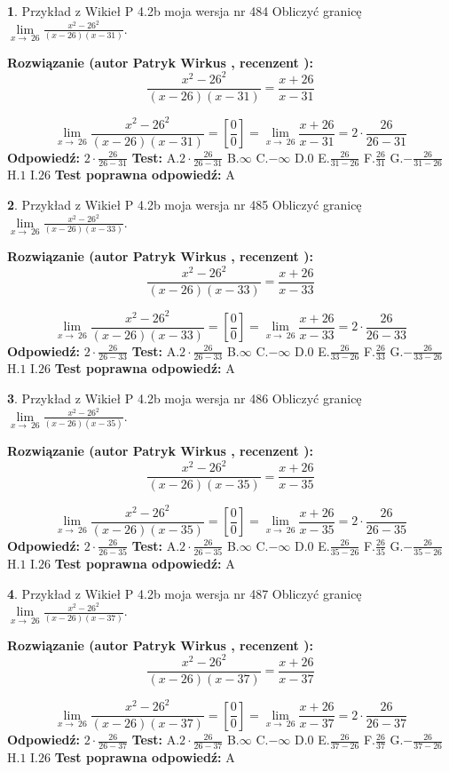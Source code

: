 \documentclass[12pt, a4paper]{article}
\theoremstyle{definition} %
\newtheorem{zad}{}
\newcommand{\zadStart}[1]{\begin{zad}#1\newline}
\newcommand{\zadStop}{\end{zad}}
\newcommand{\rozwStart}[2]{\noindent \textbf{Rozwiązanie (autor #1 , recenzent #2): }\newline}
\newcommand{\rozwStop}{\newline}
\newcommand{\odpStart}{\noindent \textbf{Odpowiedź:}\newline}
\newcommand{\odpStop}{\newline}
\newcommand{\testStart}{\noindent \textbf{Test:}\newline}
\newcommand{\testStop}{\newline}
\newcommand{\kluczStart}{\noindent \textbf{Test poprawna odpowiedź:}\newline}
\newcommand{\kluczStop}{\newline}
\begin{document}
\zadStart{Przykład z Wikieł P 4.2b moja wersja nr 484}
Obliczyć granicę $\lim\limits_{x\to\ 26}\frac{x^{2}-26^{2}}{(x-26)(x-31)}$.
\zadStop
\rozwStart{Patryk Wirkus}{}
$$\frac{x^{2}-26^{2}}{(x-26)(x-31)}=\frac{x+26}{x-31}$$

$$\lim\limits_{x\to\ 26}\frac{x^{2}-26^{2}}{(x-26)(x-31)}=[\frac{0}{0}]=\lim\limits_{x\to\ 26}\frac{x+26}{x-31}=2 \cdot \frac{26}{26-31}$$
\rozwStop
\odpStart
$2 \cdot \frac{26}{26-31}$
\odpStop
\testStart
A.$2 \cdot \frac{26}{26-31}$
B.$\infty$
C.$-\infty$
D.$0$
E.$\frac{26}{31-26}$
F.$\frac{26}{31}$
G.$-\frac{26}{31-26}$
H.$1$
I.$26$
\testStop
\kluczStart
A
\kluczStop



\zadStart{Przykład z Wikieł P 4.2b moja wersja nr 485}
Obliczyć granicę $\lim\limits_{x\to\ 26}\frac{x^{2}-26^{2}}{(x-26)(x-33)}$.
\zadStop
\rozwStart{Patryk Wirkus}{}
$$\frac{x^{2}-26^{2}}{(x-26)(x-33)}=\frac{x+26}{x-33}$$

$$\lim\limits_{x\to\ 26}\frac{x^{2}-26^{2}}{(x-26)(x-33)}=[\frac{0}{0}]=\lim\limits_{x\to\ 26}\frac{x+26}{x-33}=2 \cdot \frac{26}{26-33}$$
\rozwStop
\odpStart
$2 \cdot \frac{26}{26-33}$
\odpStop
\testStart
A.$2 \cdot \frac{26}{26-33}$
B.$\infty$
C.$-\infty$
D.$0$
E.$\frac{26}{33-26}$
F.$\frac{26}{33}$
G.$-\frac{26}{33-26}$
H.$1$
I.$26$
\testStop
\kluczStart
A
\kluczStop



\zadStart{Przykład z Wikieł P 4.2b moja wersja nr 486}
Obliczyć granicę $\lim\limits_{x\to\ 26}\frac{x^{2}-26^{2}}{(x-26)(x-35)}$.
\zadStop
\rozwStart{Patryk Wirkus}{}
$$\frac{x^{2}-26^{2}}{(x-26)(x-35)}=\frac{x+26}{x-35}$$

$$\lim\limits_{x\to\ 26}\frac{x^{2}-26^{2}}{(x-26)(x-35)}=[\frac{0}{0}]=\lim\limits_{x\to\ 26}\frac{x+26}{x-35}=2 \cdot \frac{26}{26-35}$$
\rozwStop
\odpStart
$2 \cdot \frac{26}{26-35}$
\odpStop
\testStart
A.$2 \cdot \frac{26}{26-35}$
B.$\infty$
C.$-\infty$
D.$0$
E.$\frac{26}{35-26}$
F.$\frac{26}{35}$
G.$-\frac{26}{35-26}$
H.$1$
I.$26$
\testStop
\kluczStart
A
\kluczStop



\zadStart{Przykład z Wikieł P 4.2b moja wersja nr 487}
Obliczyć granicę $\lim\limits_{x\to\ 26}\frac{x^{2}-26^{2}}{(x-26)(x-37)}$.
\zadStop
\rozwStart{Patryk Wirkus}{}
$$\frac{x^{2}-26^{2}}{(x-26)(x-37)}=\frac{x+26}{x-37}$$

$$\lim\limits_{x\to\ 26}\frac{x^{2}-26^{2}}{(x-26)(x-37)}=[\frac{0}{0}]=\lim\limits_{x\to\ 26}\frac{x+26}{x-37}=2 \cdot \frac{26}{26-37}$$
\rozwStop
\odpStart
$2 \cdot \frac{26}{26-37}$
\odpStop
\testStart
A.$2 \cdot \frac{26}{26-37}$
B.$\infty$
C.$-\infty$
D.$0$
E.$\frac{26}{37-26}$
F.$\frac{26}{37}$
G.$-\frac{26}{37-26}$
H.$1$
I.$26$
\testStop
\kluczStart
A
\kluczStop
\end{document}
